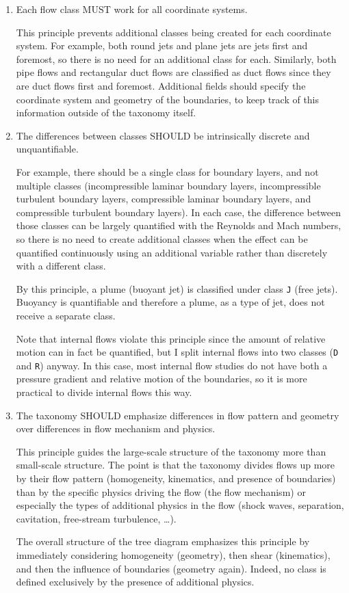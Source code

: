 \begin{enumerate}
\item
Each flow class MUST work for all coordinate systems.

This principle prevents additional classes being created for each coordinate
system.  For example, both round jets and plane jets are jets first and
foremost, so there is no need for an additional class for each.  Similarly,
both pipe flows and rectangular duct flows are classified as duct flows since
they are duct flows first and foremost.  Additional fields should specify the
coordinate system and geometry of the boundaries, to keep track of this
information outside of the taxonomy itself.


\item
The differences between classes SHOULD be intrinsically discrete and
unquantifiable.

For example, there should be a single class for boundary layers, and not
multiple classes (incompressible laminar boundary layers, incompressible
turbulent boundary layers, compressible laminar boundary layers, and
compressible turbulent boundary layers).  In each case, the difference between
those classes can be largely quantified with the Reynolds and Mach numbers, so
there is no need to create additional classes when the effect can be quantified
continuously using an additional variable rather than discretely with a
different class.

By this principle, a plume (buoyant jet) is classified under class \texttt{J}
(free jets).  Buoyancy is quantifiable and therefore a plume, as a type of jet,
does not receive a separate class.

Note that internal flows violate this principle since the amount of relative
motion can in fact be quantified, but I split internal flows into two classes
(\texttt{D} and \texttt{R}) anyway.  In this case, most internal flow studies
do not have both a pressure gradient and relative motion of the boundaries, so
it is more practical to divide internal flows this way.


\item
The taxonomy SHOULD emphasize differences in flow pattern and geometry over
differences in flow mechanism and physics.

This principle guides the large-scale structure of the taxonomy more than
small-scale structure.  The point is that the taxonomy divides flows up more by
their flow pattern (homogeneity, kinematics, and presence of boundaries) than
by the specific physics driving the flow (the flow mechanism) or especially the
types of additional physics in the flow (shock waves, separation, cavitation,
free-stream turbulence, \ldots).

The overall structure of the tree diagram emphasizes this principle by
immediately considering homogeneity (geometry), then shear (kinematics), and
then the influence of boundaries (geometry again).  Indeed, no class is defined
exclusively by the presence of additional physics.


\end{enumerate}
